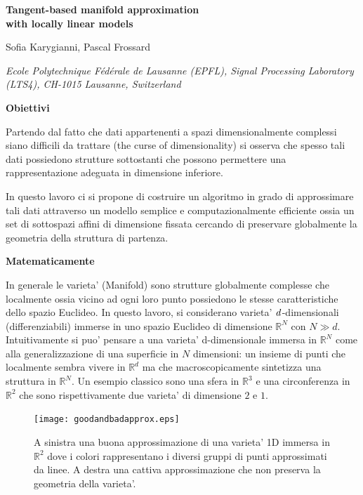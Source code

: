 \documentclass[a4, landscape]{seminar}
\theoremstyle{definition}
\newcommand{\RR}{\mathbb{R}}
\def\bc{\begin{center}}
\def\ec{\end{center}}
\def\bs{\begin{slide}\begingroup\small}
\def\es{\endgroup\end{slide}}
\begin{document}
\large

\bs
\bc{\bf\color{blue}Tangent-based manifold approximation \\with locally linear models}\ec

\vskip 0.2in

\bc{{\color{red} Sofia Karygianni, Pascal Frossard}}\ec

\vskip 0.2in

\bc{\footnotesize \it Ecole Polytechnique Fédérale de Lausanne (EPFL), Signal Processing Laboratory (LTS4), CH-1015 Lausanne, Switzerland}\ec
\es

\bs
\bc{\bf\color{blue}Obiettivi}\ec
Partendo dal fatto che dati appartenenti a spazi dimensionalmente complessi siano difficili da trattare (the curse of dimensionality)
si osserva che spesso tali dati possiedono strutture sottostanti che possono permettere una rappresentazione adeguata in dimensione inferiore.
\vskip 0.2in

In questo lavoro ci si propone di costruire un algoritmo in grado di approssimare tali dati attraverso un modello semplice e computazionalmente efficiente ossia un set di sottospazi affini di dimensione fissata cercando di preservare globalmente la geometria della struttura di partenza.
\es

\bs
\bc{\bf\color{blue}Matematicamente}\ec
In generale le varieta' (Manifold) sono strutture globalmente complesse che localmente ossia vicino ad ogni loro punto possiedono le stesse caratteristiche dello spazio Euclideo. In questo lavoro, si considerano varieta' $\it d$-dimensionali (differenziabili) immerse in uno spazio Euclideo di dimensione $\RR^{N}$ con $N \gg d$.
	Intuitivamente si puo' pensare a una varieta' d-dimensionale immersa in $\RR^{N}$ come alla generalizzazione di una superficie in $N$ dimensioni: un insieme di punti che localmente sembra vivere in $\RR^{d}$ ma che macroscopicamente sintetizza una struttura in $\RR^{N}$.
\vskip 0.2in
Un esempio classico sono una sfera in $\RR^{3}$ e una circonferenza in $\RR^{2}$ che sono rispettivamente due varieta' di dimensione $2$ e $1$.
\es

\bs
\begin{figure}[b]
\centering
\texttt{[image: goodandbadapprox.eps]}
\caption{A sinistra una buona approssimazione di una varieta' 1D immersa in $\RR^{2}$ dove i colori rappresentano i diversi gruppi di punti approssimati da linee. A destra una cattiva approssimazione che non preserva la geometria della varieta'.}
\end{figure}
\es
\end{document}
